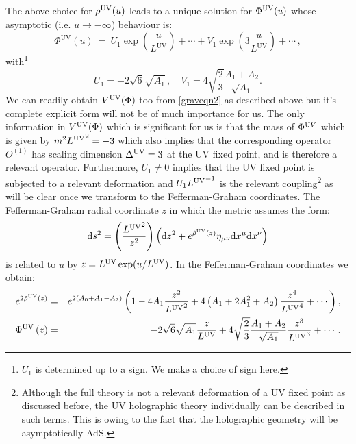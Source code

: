 \documentclass[prd,reprint,a4paper,showpacs,superscriptaddress,11pt,onecolumn,nofootinbib]{revtex4-1}
\renewcommand{\(}{\left(}
\renewcommand{\)}{\right)}
\newcommand{\6}{\partial}
\begin{document}
The above choice for $\rho^{\rm UV} (u)$ leads to a unique solution for $\Phi^{\rm UV}(u)$ whose asymptotic (i.e. $u\rightarrow -\infty$) behaviour is:
\begin{equation}
\Phi^{\text{UV}}\left(u\right) ~ = ~ U_1 \exp\left(\dfrac{u}{L^{\text{UV}}}\right) + \cdots + V_1 \exp\left(3 \dfrac{u}{L^{\text{UV}}}\right) + \cdots \label{eqn:reluvphi} \, ,
\end{equation}
with\footnote{$U_1$ is determined up to a sign. We make a choice of sign here.} 
\begin{equation}
U_1 = -2 \sqrt{6} \sqrt{A_1} \,, \quad V_1 = 4 \sqrt{\dfrac{2}{3}} \dfrac{A_1 + A_2}{\sqrt{A_1}}.
\end{equation}
We can readily obtain $V^{\rm UV}(\Phi)$ too from \eqref{graveqn2} as described above but it's complete explicit form will not be of much importance for us. The only information in $V^{\rm UV}(\Phi)$ which is significant for us is that the mass of $\Phi^{\text UV}$ which is given by $m^2{L^{\rm UV}}^2 = -3 $ which also implies that the corresponding operator $O^{(1)}$ has scaling dimension $\Delta^{\rm UV} = 3$ at the UV fixed point, and is therefore a relevant operator. Furthermore, $U_1 \neq 0$ implies that the UV fixed point is subjected to a relevant deformation and $U_1 {L^{\rm UV}}^{-1}$ is the relevant coupling\footnote{Although the full theory is not a relevant deformation of a UV fixed point as discussed before, the UV holographic theory individually can be described in such terms. This is owing to the fact that the holographic geometry will be asymptotically AdS.} as will be clear once we transform to the Fefferman-Graham coordinates. The Fefferman-Graham radial coordinate $z$ in which the metric assumes the form:
\begin{equation}
{\rm d}s^2 = \left(\frac{{L^{\rm UV}}^2}{z^2}\right)\left({\rm d}z^2+e^{\tilde{\rho}^{\rm UV}(z)}\eta_{\mu\nu}{\rm d}x^\mu {\rm d}x^\nu\right)
\end{equation}
is related to $u$ by $z = L^{\rm UV} \exp (u/L^{\rm UV})$. In the Fefferman-Graham coordinates we obtain:
\begin{eqnarray}
 e^{2 \tilde{\rho}^{\text{UV}}(z)} &=& e^{2 \left(A_0 + A_1 - A_2\right)}  \left(1 - 4 A_1 \frac{z^2}{{L^{\rm UV}}^2} + {4} \left(A_1 + 2 A_1^2 + A_2 \right)\frac{z^4}{{L^{\rm UV}}^4} + \cdots \right),\nonumber\\
 \Phi^{\text{UV}}\left(z\right) &=&   -2 \sqrt{6} \sqrt{A_1}  \frac{z}{L^{\rm UV}} + 4 \sqrt{\dfrac{2}{3}} \dfrac{A_1 + A_2}{\sqrt{A_1}} \frac{z^3}{{L^{\rm UV}}^3}+ \cdots \, .
\end{eqnarray}
\end{document}
